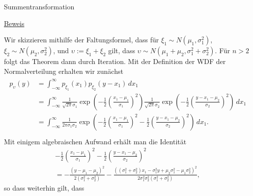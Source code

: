 \documentclass[
  8pt,
  ignorenonframetext,
]{beamer}
\newcommand{\ups}{\upsilon}
\begin{document}
\begin{frame}{Summentransformation}
\protect\hypertarget{summentransformation-2}{}
\footnotesize

\underline{Beweis}

Wir skizzieren mithilfe der Faltungsformel, dass für
\(\xi_1 \sim N(\mu_1,\sigma^2_1)\), \(\xi_2 \sim N(\mu_2,\sigma^2_2)\),
und \(\ups := \xi_1 + \xi_2\) gilt, dass
\(\ups \sim N(\mu_1 + \mu_2,\sigma_1^2 + \sigma_2^2)\). Für \(n > 2\)
folgt das Theorem dann durch Iteration. Mit der Definition der WDF der
Normalverteilung erhalten wir zunächst \begin{align}
\begin{split}
p_\ups(y)
& = \int_{-\infty}^\infty p_{\xi_1}(x_1)p_{\xi_2}(y - x_1)\,dx_1
\\
& = \int_{-\infty}^\infty
    \frac{1}{\sqrt{2 \pi} \sigma_1} \exp\left(-\frac{1}{2}\left(\frac{x_1 - \mu_1}{\sigma_1}\right)^2\right)
    \frac{1}{\sqrt{2 \pi} \sigma_2} \exp\left(-\frac{1}{2}\left(\frac{y - x_1 - \mu_2}{\sigma_2}\right)^2\right)
    \,dx_1
\\
& = \int_{-\infty}^\infty
    \frac{1}{2 \pi \sigma_1\sigma_2}\exp
    \left(
    -\frac{1}{2}\left(\frac{x_1 - \mu_1}{\sigma_1}\right)^2
    -\frac{1}{2}\left(\frac{y - x_1 - \mu_2}{\sigma_2}\right)^2
    \right)
    \,dx_1 .
\\
\end{split}
\end{align} Mit einigem algebraischen Aufwand erhält man die Identität
\begin{multline}
-\frac{1}{2}\left(\frac{x_1 - \mu_1}{\sigma_1}\right)^2
-\frac{1}{2}\left(\frac{y - x_1 - \mu_2}{\sigma_2}\right)^2
\\ =
-\frac{(y - \mu_1 - \mu_2)^2}
      {2(\sigma_1^2 + \sigma_2^2)}
-\frac{((\sigma_1^2 + \sigma_2^2)x_1 -\sigma_1^2y + \mu_2 \sigma_1^2 - \mu_1 \sigma_2^2)^2}
      {2\sigma_1^2\sigma_2^2(\sigma_1^2 + \sigma_2^2)},
\end{multline} so dass weiterhin gilt, dass
\end{frame}
\end{document}

